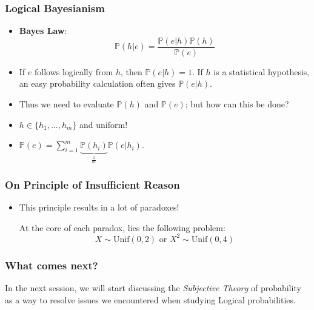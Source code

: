 \documentclass[usenames,dvipsnames, 10pt]{beamer}
\begin{document}
\begin{frame}
	\frametitle{Logical Bayesianism}
	
	\begin{itemize}

		\item \textbf{Bayes Law}:
		\begin{equation*}
			\mathbb{P}(h|e) = \frac{\mathbb{P}(e|h) \mathbb{P}(h)}{\mathbb{P}(e)}
		\end{equation*}
		\pause
		\item If $e$ follows logically from $h$, then $\mathbb{P}(e | h) = 1$. If $h$ is a statistical hypothesis, an easy probability calculation often gives $\mathbb{P}(e | h)$.
		
		\pause
		\item Thus we need to evaluate $\mathbb{P}(h)$ and $\mathbb{P}(e)$; but how can this be done?
		
		\pause
		\item $h \in \{h_1, \dots, h_m\}$ and uniform!
		
		\pause
		\item $\mathbb{P} (e) = \sum_{i = 1}^{m} \underbrace{\mathbb{P}(h_i)}_{\frac{1}{m}} \mathbb{P}(e|h_i)$.
	\end{itemize}
\end{frame}

\begin{frame}
	\frametitle{On Principle of Insufficient Reason}
	\begin{itemize}
		\item This principle results in a lot of paradoxes!
		\pause
		
		\vspace{1cm}
		At the core of each paradox,  lies the following problem:
		\pause
		$$X \sim \mathrm{Unif}(0, 2) \text{    or    } X^2 \sim \mathrm{Unif} (0, 4)$$
	\end{itemize}
	
\end{frame}

\begin{frame}
	\frametitle{What comes next?}
	 In the next session, we will start discussing the \emph{Subjective Theory} of probability as a way to resolve issues we encountered when studying Logical probabilities.

\end{frame}


%
%
%
%
\end{document}
